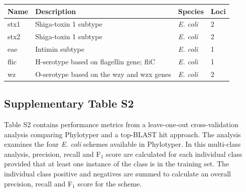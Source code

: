 \documentclass[11pt,letterpaper]{article}
\begin{document}
\begin{minipage}{\linewidth}
\centering
{}
\medskip
\begin{tabular}{@{}llll@{}}\toprule Name &
Description & Species & Loci\\\midrule
stx1 & Shiga-toxin 1 subtype & {\it E. coli} & 2 \\
stx2 & Shiga-toxin 1 subtype & {\it E. coli} & 2\\
eae & Intimin subtype & {\it E. coli} & 1\\
flic & H-serotype based on flagellin gene; fliC & {\it E. coli} & 1\\
wz & O-serotype based on the wzy and wzx genes & {\it E. coli} & 2\\\bottomrule
\end{tabular}\par

\end{minipage}

\clearpage

\subsection{Supplementary Table S2}

Table S2 contains performance metrics from a leave-one-out cross-validation analysis comparing Phylotyper and a top-BLAST hit approach.  The analysis examines the four \textit{E. coli} schemes available in Phylotyper. In this multi-class analysis, precision, recall and F$_{1}$ score are calculated for each individual class provided that at least one instance of the class is in the training set.  The individual class positive and negatives are summed to calculate an overall precision, recall and F$_{1}$ score for the scheme.

\end{document}
